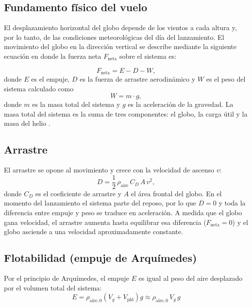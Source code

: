 \documentclass[12pt,a4paper]{article}
\begin{document}
\subsection{Fundamento físico del vuelo}\label{fundamento-fuxedsico-del-vuelo}
El desplazamiento horizontal del globo depende de los vientos a cada altura y, por lo tanto, de las condiciones meteorológicas del día del lanzamiento. El movimiento del globo en la dirección vertical se describe mediante la siguiente ecuación en donde la fuerza neta $F_{\text{neta}}$ sobre el sistema es:

\begin{equation}
  F_{\text{neta}} = E - D - W,
  \label{eq:fuerza-neta}
\end{equation}
donde $E$ es el empuje, $D$ es la fuerza de arrastre aerodinámico y $W$ es el peso del sistema calculado como 
\begin{equation}
  W = m \cdot g,
  \label{eq:peso}
\end{equation}
donde $m$ es la masa total del sistema y $g$ es la aceleración de la gravedad. La masa total del sistema es la suma de tres componentes: el globo, la carga útil y la masa del helio \cite{ref73}. 

 
\subsection{Arrastre}\label{arrastre}

El arrastre se opone al movimiento y crece con la velocidad de ascenso $v$:
\begin{equation}
  D = \frac{1}{2}\,\rho_{\text{aire}}\,C_D\,A\,v^{2},
  \label{eq:arrastre}
\end{equation}
donde $C_D$ es el coeficiente de arrastre y $A$ el área frontal del globo. En el momento del lanzamiento el sistema parte del reposo, por lo que $D = 0$ y toda la diferencia entre empuje y peso se traduce en aceleración. A medida que el globo gana velocidad, el arrastre aumenta hasta equilibrar esa diferencia ($F_{\text{neta}} = 0$) y el globo asciende a una velocidad aproximadamente constante.
 

\subsection{Flotabilidad (empuje de Arquímedes)}\label{flotabilidad-empuje-de-arquuxedmedes}


Por el principio de Arquímedes, el empuje $E$ es igual al peso del aire desplazado por el volumen total del sistema:
\begin{equation}
  E = \rho_{\text{aire},0}\left(V_g + V_{\text{pld}}\right) g
  \approx \rho_{\text{aire},0}\, V_g\, g
  \label{eq:empuje}
\end{equation}
\end{document}
